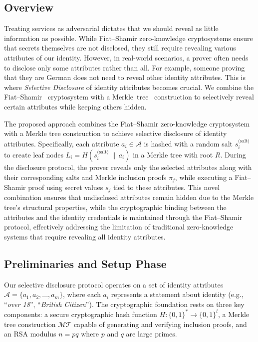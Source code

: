 \subsection{Overview}

Treating services as adversarial dictates that we should reveal as little information as possible. While Fiat--Shamir zero-knowledge cryptosystems ensure that secrets themselves are not disclosed, they still require revealing various attributes of our identity. However, in real-world scenarios, a prover often needs to disclose only some attributes rather than all. For example, someone proving that they are German does not need to reveal other identity attributes. This is where \textit{Selective Disclosure} of identity attributes becomes crucial. We combine the Fiat--Shamir~\cite{fiat_how_1987} cryptosystem with a Merkle~tree~\cite{merkle1987digital} construction to selectively reveal certain attributes while keeping others hidden.

The proposed approach combines the Fiat--Shamir zero-knowledge cryptosystem with a Merkle tree construction to achieve selective disclosure of identity attributes. Specifically, each attribute $a_i \in \mathcal{A}$ is hashed with a random salt $s_i^{\text{(salt)}}$ to create leaf nodes $L_i = H(s_i^{\text{(salt)}} \,\|\, a_i)$ in a Merkle tree with root $R$. During the disclosure protocol, the prover reveals only the selected attributes along with their corresponding salts and Merkle inclusion proofs $\pi_j$, while executing a Fiat--Shamir proof using secret values $s_j$ tied to these attributes. This novel combination ensures that undisclosed attributes remain hidden due to the Merkle tree's structural properties, while the cryptographic binding between the attributes and the identity credentials is maintained through the Fiat--Shamir protocol, effectively addressing the limitation of traditional zero-knowledge systems that require revealing all identity attributes.

\subsection{Preliminaries and Setup Phase}

Our selective disclosure protocol operates on a set of identity attributes $\mathcal{A} = \{a_1, a_2, ..., a_m\}$, where each $a_i$ represents a statement about identity (e.g., ``\textit{over 18}'', ``\textit{British Citizen}''). The cryptographic foundation rests on three key components: a secure cryptographic hash function $H: \{0,1\}^* \rightarrow \{0,1\}^l$, a Merkle tree construction $\mathcal{MT}$ capable of generating and verifying inclusion proofs, and an RSA modulus $n = pq$ where $p$ and $q$ are large primes.

